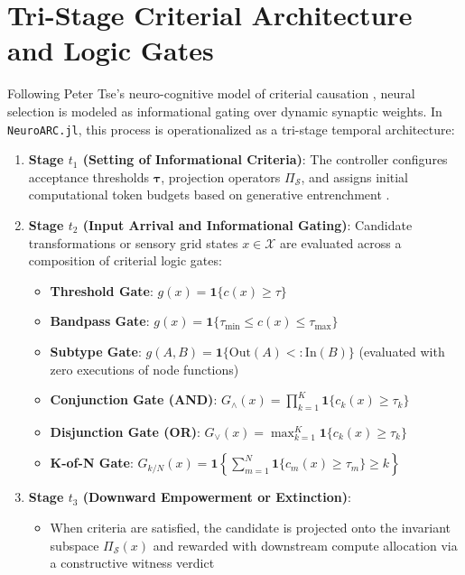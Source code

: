 \section{Tri-Stage Criterial Architecture and Logic Gates}

Following Peter Tse's neuro-cognitive model of criterial causation \cite{tse2013neural}, neural selection is modeled as informational gating over dynamic synaptic weights. In \texttt{NeuroARC.jl}, this process is operationalized as a tri-stage temporal architecture:

\begin{enumerate}
  \item \textbf{Stage $t_1$ (Setting of Informational Criteria)}: The controller configures acceptance thresholds $\boldsymbol{\tau}$, projection operators $\Pi_{\mathcal{S}}$, and assigns initial computational token budgets based on generative entrenchment \cite{wimsatt1986developmental}.
  \item \textbf{Stage $t_2$ (Input Arrival and Informational Gating)}: Candidate transformations or sensory grid states $x \in \mathcal{X}$ are evaluated across a composition of criterial logic gates:
  \begin{itemize}
    \item \textbf{Threshold Gate}: $g(x) = \mathbf{1}\{c(x) \ge \tau\}$
    \item \textbf{Bandpass Gate}: $g(x) = \mathbf{1}\{\tau_{\min} \le c(x) \le \tau_{\max}\}$
    \item \textbf{Subtype Gate}: $g(A, B) = \mathbf{1}\{\mathrm{Out}(A) <: \mathrm{In}(B)\}$ (evaluated with zero executions of node functions)
    \item \textbf{Conjunction Gate (AND)}: $G_{\land}(x) = \prod_{k=1}^K \mathbf{1}\{c_k(x) \ge \tau_k\}$
    \item \textbf{Disjunction Gate (OR)}: $G_{\lor}(x) = \max_{k=1}^K \mathbf{1}\{c_k(x) \ge \tau_k\}$
    \item \textbf{K-of-N Gate}: $G_{k/N}(x) = \mathbf{1}\left\{\sum_{m=1}^N \mathbf{1}\{c_m(x) \ge \tau_m\} \ge k\right\}$
  \end{itemize}
  \item \textbf{Stage $t_3$ (Downward Empowerment or Extinction)}:
  \sloppy
  \begin{itemize}
    \item When criteria are satisfied, the candidate is projected onto the invariant subspace $\Pi_{\mathcal{S}}(x)$ and rewarded with downstream compute allocation via a constructive witness verdict\\

\end{itemize}
\end{enumerate}
